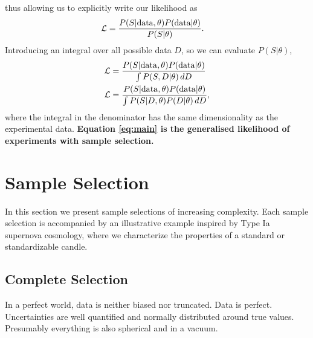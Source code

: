 \documentclass[a4paper,fleqn,usenatbib]{mnras}
\begin{document}
thus allowing us to explicitly write our likelihood as
\begin{align}
\mathcal{L}&= \frac{P(S|{\rm data},\theta) P({\rm data}|\theta)}{P(S|\theta)}.
\end{align}
Introducing an integral over all possible data $D$, so we can evaluate $P(S|\theta)$, 
\begin{align}
\mathcal{L}&= \frac{P(S|{\rm data},\theta) P({\rm data}|\theta)}{\int P(S, D|\theta)\, dD} \\
\mathcal{L} &= \frac{P(S|{\rm data},\theta) P({\rm data}|\theta)}{\int P(S | D, \theta) P(D|\theta)\, dD}, \label{eq:main}
\end{align}
where the integral in the denominator has the same dimensionality as the experimental data. \textbf{Equation \ref{eq:main} is the generalised likelihood of experiments with sample selection.}




\section{Sample Selection}
\label{sec:examples}

 In this section we present sample selections of increasing complexity. Each sample selection is accompanied by an illustrative example inspired by Type Ia supernova cosmology, where we characterize the properties of a standard or standardizable candle.
 
 
\subsection{Complete Selection}
\label{sec:perfect}
In a perfect world, data is neither biased nor truncated. Data is perfect. Uncertainties are well quantified and normally distributed around true values. Presumably everything is also spherical and in a vacuum.
\end{document}
